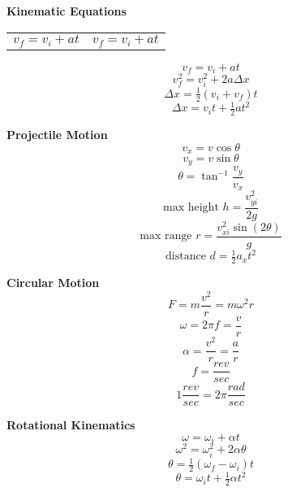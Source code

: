 \documentclass[12pt]{article}
\begin{document}
\begin{minipage}[t]{.5\textwidth}
\textbf{\large{Kinematic Equations}} \\
	\begin{tabular}{l l}
	$v_f = v_i + at$ \hspace{12pt} & $v_f = v_i + at$\\
	\end{tabular}
	\[v_f = v_i + at\]\vspace{-9pt}
	\[v_f^2 = v_i^2 + 2a \Delta x\]\vspace{-9pt}
	\[\Delta x = \tfrac{1}{2}(v_i + v_f)t\]\vspace{-9pt}
	\[\Delta x = v_i t + \tfrac{1}{2} at^2\]

\end{minipage}
\begin{minipage}[t]{.5\textwidth}
\textbf{\large{Projectile Motion}} \\
	\[v_x = v \cos \theta \]
	\[v_y = v \sin \theta \]
	\[\theta = \tan ^{-1} \frac{v_y}{v_x} \]
	\[\text{max height   } h = \frac{v_{yi}^2}{2g} \]
	\[\text{max range   } r = \frac{v_{xi}^2 \sin(2\theta)}{g} \]
	\[\text{distance    } d = \tfrac{1}{2} a_x t^2\]

\end{minipage}\vspace{12pt}
\begin{minipage}[t]{.5\textwidth}
\textbf{\large{Circular Motion}} \\
	\[F = m \frac{v^2}{r} = m\omega^2 r \]
	\[\omega = 2\pi f = \frac{v}{r}\]
	\[\alpha = \frac{v^2}{r} = \frac{a}{r}\]
	\[f = \frac{rev}{sec} \]
	\[1 \frac{rev}{sec} = 2\pi \frac{rad}{sec} \]

\end{minipage}
\begin{minipage}[t]{.5\textwidth}
\textbf{\large{Rotational Kinematics}} \\
	\[\omega = \omega_i +\alpha t \]
	\[\omega^2 = \omega_i^2 + 2\alpha \theta \]
	\[\theta = \tfrac{1}{2} (\omega_f - \omega_i) t \]
	\[\theta = \omega_i t + \tfrac{1}{2} \alpha t^2 \]


\end{minipage}
\end{document}

